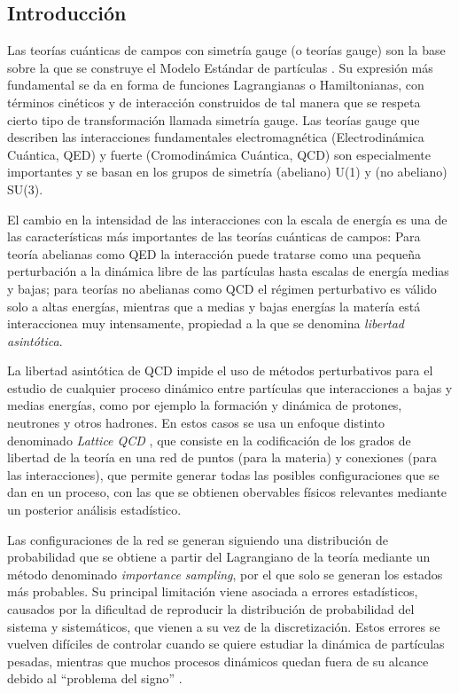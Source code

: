 \documentclass[a4paper,10pt]{article}
\begin{document}
\begin{multicols}{2}
\section{Introducción} 
Las teorías cuánticas de campos con simetría gauge (o teorías gauge) son la base sobre la que se construye el Modelo Estándar de partículas \cite{Peskin:1995ev}. Su expresión más fundamental se da en forma de funciones Lagrangianas o Hamiltonianas, con términos cinéticos y de interacción construidos de tal manera que se respeta cierto tipo de transformación llamada simetría gauge. Las teorías gauge que describen las interacciones fundamentales electromagnética (Electrodinámica Cuántica, QED) y fuerte (Cromodinámica Cuántica, QCD) son especialmente importantes y se basan en los grupos de simetría (abeliano) U(1) y (no abeliano) SU(3).

El cambio en la intensidad de las interacciones con la escala de energía es una de las características más importantes de las teorías cuánticas de campos: Para teoría abelianas como QED la interacción puede tratarse como una pequeña perturbación a la dinámica libre de las partículas hasta escalas de energía medias y bajas; para teorías no abelianas como QCD el régimen perturbativo es válido solo a altas energías, mientras que a medias y bajas energías la matería está interaccionea muy intensamente, propiedad a la que se denomina \textit{libertad asintótica}.

La libertad asintótica de QCD impide el uso de métodos perturbativos para el estudio de cualquier proceso dinámico entre partículas que interacciones a bajas y medias energías, como por ejemplo la formación y dinámica de protones, neutrones y otros hadrones. En estos casos se usa un enfoque distinto denominado \textit{Lattice QCD} \cite{particle_data_group_review_2018}, que consiste en la codificación de los grados de libertad de la teoría en una red de puntos (para la materia) y conexiones (para las interacciones), que permite generar todas las posibles configuraciones que se dan en un proceso, con las que se obtienen obervables físicos relevantes mediante un posterior análisis estadístico. 

Las configuraciones de la red se generan siguiendo una distribución de probabilidad que se obtiene a partir del Lagrangiano de la teoría mediante un método denominado \textit{importance sampling}, por el que solo se generan los estados más probables. Su principal limitación viene asociada a errores estadísticos, causados por la dificultad de reproducir la distribución de probabilidad del sistema y sistemáticos, que vienen a su vez de la discretización. Estos errores se vuelven difíciles de controlar cuando se quiere estudiar la dinámica de partículas pesadas, mientras que muchos procesos dinámicos quedan fuera de su alcance debido al ``problema del signo'' \cite{particle_data_group_review_2018,usqcd_collaboration_hot-dense_2019}. 


\end{multicols}
\end{document}
